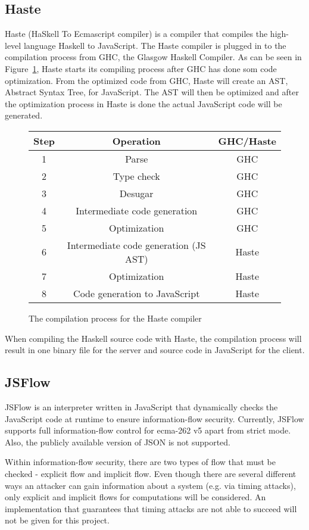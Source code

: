 \subsection{Haste}
Haste (HaSkell To Ecmascript compiler) is a compiler that compiles the high-level language Haskell to JavaScript. The Haste compiler is plugged in to the compilation process from GHC, the Glasgow Haskell Compiler. As can be seen in Figure~\ref{fig:system}, Haste starts its compiling process after GHC has done som code optimization. From the optimized code from GHC, Haste will create an AST, Abstract Syntax Tree, for JavaScript. The AST will then be optimized and after the optimization process in Haste is done the actual JavaScript code will be generated.
\begin{figure}[h]
  \begin{tabular}{|c|c|c|}
    \hline
    Step & Operation & GHC/Haste \\
    \hline
    1 & Parse & GHC \\
    2 & Type check & GHC \\
    3 & Desugar & GHC \\
    4 & Intermediate code generation & GHC \\
    5 & Optimization & GHC \\
    6 & Intermediate code generation (JS AST) & Haste \\
    7 & Optimization & Haste \\
    8 & Code generation to JavaScript & Haste \\
    \hline
  \end{tabular}
  \caption{The compilation process for the Haste compiler}
  \label{fig:system}
\end{figure}

When compiling the Haskell source code with Haste, the compilation process will result in one binary file for the server and source code in JavaScript for the client.\cite{haste-symposium}

\subsection{JSFlow}
JSFlow is an interpreter written in JavaScript that dynamically checks the JavaScript code at runtime to ensure information-flow security. Currently, JSFlow supports full information-flow control for ecma-262 v5 apart from strict mode. Also, the publicly available version of JSON is not supported.

Within information-flow security, there are two types of flow that must be checked - explicit flow and implicit flow. Even though there are several different ways an attacker can gain information about a system (e.g. via timing attacks), only explicit and implicit flows for computations will be considered. An implementation that guarantees that timing attacks are not able to succeed will not be given for this project.

